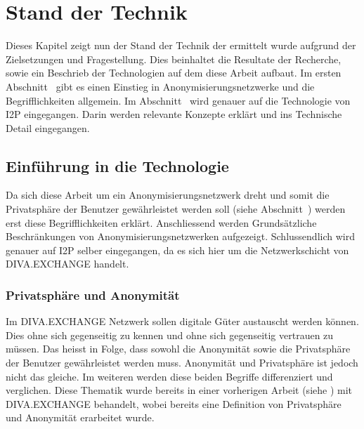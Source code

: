 \chapter{Stand der Technik}\label{ch:StandDerTechnik}


Dieses Kapitel zeigt nun der Stand der Technik der ermittelt wurde aufgrund der Zielsetzungen und Fragestellung.
Dies beinhaltet die Resultate der Recherche, sowie ein Beschrieb der Technologien auf dem diese Arbeit aufbaut.
Im ersten Abschnitt~ gibt es einen Einstieg in Anonymisierungsnetzwerke und die Begrifflichkeiten allgemein.
Im Abschnitt~ wird genauer auf die Technologie von I2P eingegangen.
Darin werden relevante Konzepte erklärt und ins Technische Detail eingegangen.

\section{Einführung in die Technologie}\label{sec:techintro}

Da sich diese Arbeit um ein Anonymisierungsnetzwerk dreht und somit die Privatsphäre der Benutzer gewährleistet werden soll (siehe Abschnitt~)
werden erst diese Begrifflichkeiten erklärt.
Anschliessend werden Grundsätzliche Beschränkungen von Anonymisierungsnetzwerken aufgezeigt.
Schlussendlich wird genauer auf I2P selber eingegangen, da es sich hier um die Netzwerkschicht von DIVA.EXCHANGE handelt.

\subsection{Privatsphäre und Anonymität}\label{sec:privacy_anonymity}

Im DIVA.EXCHANGE Netzwerk sollen digitale Güter austauscht werden können.
Dies ohne sich gegenseitig zu kennen und ohne sich gegenseitig vertrauen zu müssen.
Das heisst in Folge, dass sowohl die Anonymität sowie die Privatsphäre der Benutzer gewährleistet werden muss.
Anonymität und Privatsphäre ist jedoch nicht das gleiche. Im weiteren werden diese beiden Begriffe differenziert und verglichen.
Diese Thematik wurde bereits in einer vorherigen Arbeit (siehe \cite[S. 8-9]{maric_untersuchung_2020}) mit DIVA.EXCHANGE behandelt,
wobei bereits eine Definition von Privatsphäre und Anonymität erarbeitet wurde.

